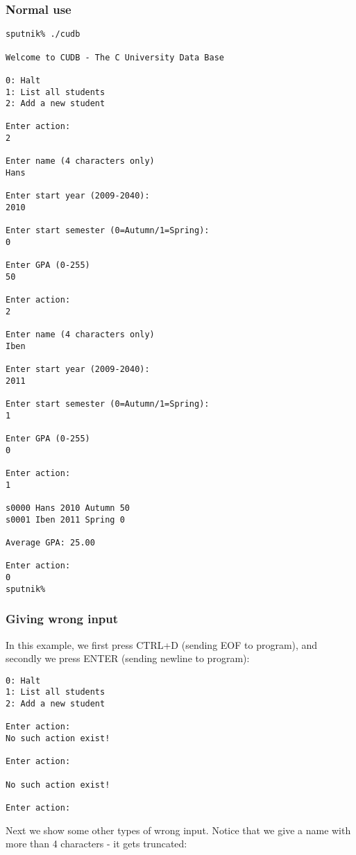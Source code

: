 \subsubsection*{Normal use}
\begin{verbatim}
sputnik% ./cudb 

Welcome to CUDB - The C University Data Base

0: Halt
1: List all students
2: Add a new student

Enter action:
2

Enter name (4 characters only)
Hans

Enter start year (2009-2040):
2010

Enter start semester (0=Autumn/1=Spring):
0

Enter GPA (0-255)
50

Enter action:
2

Enter name (4 characters only)
Iben

Enter start year (2009-2040):
2011

Enter start semester (0=Autumn/1=Spring):
1

Enter GPA (0-255)
0

Enter action:
1

s0000 Hans 2010 Autumn 50
s0001 Iben 2011 Spring 0

Average GPA: 25.00

Enter action:
0
sputnik%
\end{verbatim}

\subsubsection*{Giving wrong input}
In this example, we first press CTRL+D (sending EOF to program),
and secondly we press ENTER (sending newline to program):

\begin{verbatim}
0: Halt
1: List all students
2: Add a new student

Enter action:
No such action exist!

Enter action:

No such action exist!

Enter action:

\end{verbatim}

Next we show some other types of wrong input.
Notice that we give a name with more than 4 characters - it
gets truncated:

